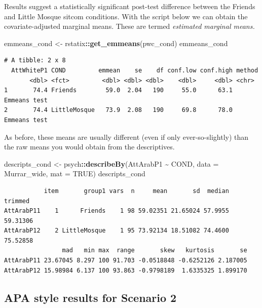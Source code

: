\documentclass[
  11pt,
]{book}
\newenvironment{Shaded}{\begin{snugshade}}{\end{snugshade}}
\newcommand{\AttributeTok}[1]{\textcolor[rgb]{0.27,0.27,0.27}{#1}}
\newcommand{\ConstantTok}[1]{\textcolor[rgb]{0.37,0.37,0.37}{#1}}
\newcommand{\FunctionTok}[1]{\textcolor[rgb]{0.27,0.27,0.27}{\textbf{#1}}}
\newcommand{\NormalTok}[1]{#1}
\newcommand{\OtherTok}[1]{\textcolor[rgb]{0.37,0.37,0.37}{#1}}
\newcommand{\SpecialCharTok}[1]{\textcolor[rgb]{0.43,0.43,0.43}{\textbf{#1}}}
\begin{document}
Results suggest a statistically significant post-test difference between the Friends and Little Mosque sitcom conditions. With the script below we can obtain the covariate-adjusted marginal means. These are termed \emph{estimated marginal means.}

\begin{Shaded}
\begin{Highlighting}[]
\NormalTok{emmeans\_cond }\OtherTok{\textless{}{-}}\NormalTok{ rstatix}\SpecialCharTok{::}\FunctionTok{get\_emmeans}\NormalTok{(pwc\_cond)}
\NormalTok{emmeans\_cond}
\end{Highlighting}
\end{Shaded}

\begin{verbatim}
# A tibble: 2 x 8
  AttWhiteP1 COND         emmean    se    df conf.low conf.high method      
       <dbl> <fct>         <dbl> <dbl> <dbl>    <dbl>     <dbl> <chr>       
1       74.4 Friends        59.0  2.04   190     55.0      63.1 Emmeans test
2       74.4 LittleMosque   73.9  2.08   190     69.8      78.0 Emmeans test
\end{verbatim}

As before, these means are usually different (even if only ever-so-slightly) than the raw means you would obtain from the descriptives.

\begin{Shaded}
\begin{Highlighting}[]
\NormalTok{descripts\_cond }\OtherTok{\textless{}{-}}\NormalTok{ psych}\SpecialCharTok{::}\FunctionTok{describeBy}\NormalTok{(AttArabP1 }\SpecialCharTok{\textasciitilde{}}\NormalTok{ COND, }\AttributeTok{data =}\NormalTok{ Murrar\_wide,}
    \AttributeTok{mat =} \ConstantTok{TRUE}\NormalTok{)}
\NormalTok{descripts\_cond}
\end{Highlighting}
\end{Shaded}

\begin{verbatim}
           item       group1 vars  n     mean       sd  median  trimmed
AttArabP11    1      Friends    1 98 59.02351 21.65024 57.9955 59.31306
AttArabP12    2 LittleMosque    1 95 73.92134 18.51082 74.4600 75.52858
                mad   min max  range       skew   kurtosis       se
AttArabP11 23.67045 8.297 100 91.703 -0.0518848 -0.6252126 2.187005
AttArabP12 15.98984 6.137 100 93.863 -0.9798189  1.6335325 1.899170
\end{verbatim}

\hypertarget{apa-style-results-for-scenario-2}{%
\subsection{APA style results for Scenario 2}\label{apa-style-results-for-scenario-2}}
\end{document}
